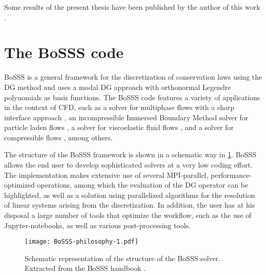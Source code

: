 Some results of the present thesis have been published by the author of this work \parencite{gutierrez-jorqueraFullyCoupledHighorder2022}.


\section{The BoSSS code}
BoSSS is a general framework for the discretization of conservation laws using the DG method and uses a modal DG approach with orthonormal Legendre polynomials as basis functions. The BoSSS code features a variety of applications in the context of \Gls{CFD}, such as a solver for multiphase flows with a sharp interface approach \parencite{kummerExtendedDiscontinuousGalerkin2017}, an incompressible Immersed Boundary Method solver for particle laden flows \parencite{krauseIncompressibleImmersedBoundary2017}, a solver for viscoelastic fluid flows \parencite{kikkerFullyCoupledHighorder}, and a solver for compressible flows \parencite{geisenhoferDiscontinuousGalerkinImmersed2019}, among others.

The structure of the BoSSS framework is shown in a schematic way in \cref{Fig:BoSSS}. BoSSS allows the end user to develop sophisticated solvers at a very low coding effort. The implementation makes extensive use of several \gls{MPI}-parallel, performance-optimized operations, among which the evaluation of the DG operator can be highlighted, as well as a solution using parallelized algorithms for the resolution of linear systems arising from the discretization. In addition, the user has at his disposal a large number of tools that optimize the workflow, such as the use of Jupyter-notebooks, as well as various post-processing tools.
\begin{figure}
	\texttt{[image: BoSSS-philosophy-1.pdf]}
	\caption[Schematic representation of the structure of the BoSSS solver.]{Schematic representation of the structure of the BoSSS solver. Extracted from the BoSSS handbook \parencite{kummer2020}.}
	\label{Fig:BoSSS}
\end{figure}

